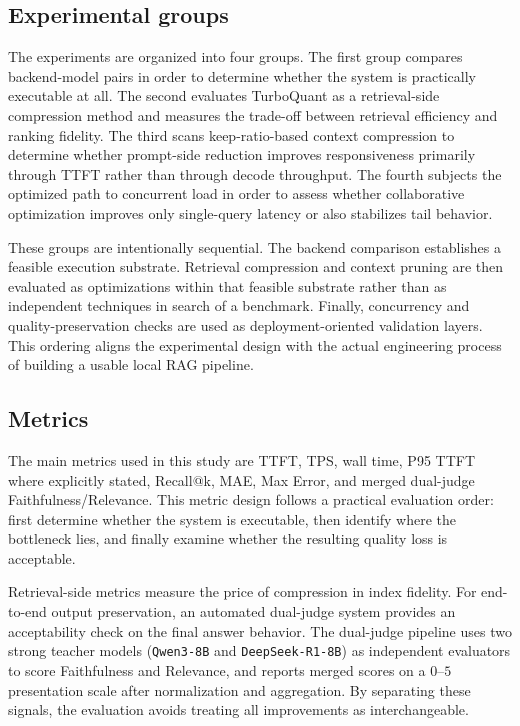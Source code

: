 \documentclass[10pt,twocolumn]{article}
\begin{document}
\subsection{Experimental groups}

The experiments are organized into four groups. The first group compares backend-model pairs in order to determine whether the system is practically executable at all. The second evaluates TurboQuant as a retrieval-side compression method and measures the trade-off between retrieval efficiency and ranking fidelity. The third scans keep-ratio-based context compression to determine whether prompt-side reduction improves responsiveness primarily through TTFT rather than through decode throughput. The fourth subjects the optimized path to concurrent load in order to assess whether collaborative optimization improves only single-query latency or also stabilizes tail behavior.

These groups are intentionally sequential. The backend comparison establishes a feasible execution substrate. Retrieval compression and context pruning are then evaluated as optimizations within that feasible substrate rather than as independent techniques in search of a benchmark. Finally, concurrency and quality-preservation checks are used as deployment-oriented validation layers. This ordering aligns the experimental design with the actual engineering process of building a usable local RAG pipeline.

\subsection{Metrics}

The main metrics used in this study are TTFT, TPS, wall time, P95 TTFT where explicitly stated, Recall@k, MAE, Max Error, and merged dual-judge Faithfulness/Relevance. This metric design follows a practical evaluation order: first determine whether the system is executable, then identify where the bottleneck lies, and finally examine whether the resulting quality loss is acceptable.

Retrieval-side metrics measure the price of compression in index fidelity. For end-to-end output preservation, an automated dual-judge system provides an acceptability check on the final answer behavior. The dual-judge pipeline uses two strong teacher models (\texttt{Qwen3-8B} and \texttt{DeepSeek-R1-8B}) as independent evaluators to score Faithfulness and Relevance, and reports merged scores on a $0$--$5$ presentation scale after normalization and aggregation. By separating these signals, the evaluation avoids treating all improvements as interchangeable.
\end{document}
